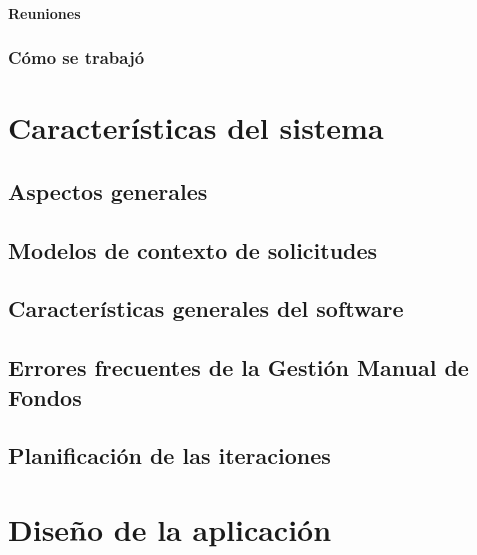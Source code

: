 \documentclass{iccmemoria}
\begin{document}
			\subsubsection{Reuniones}
			

		\subsection{Cómo se trabajó}
		
	
\chapter{Características del sistema}
\label{sec:Caracteristica_Sistema}


	\section{Aspectos generales}
	

	\section{Modelos de contexto de solicitudes}
	\label{sec: Contexto_Solicitud}
	

	\section{Características generales del software}
	

	\section{Errores frecuentes de la Gestión Manual de Fondos}
	\label{sec:Errores_Frecuentes}
	

	\section{Planificación de las iteraciones}
	

\chapter{Diseño de la aplicación}
\label{sec:Disenio}

\end{document}
